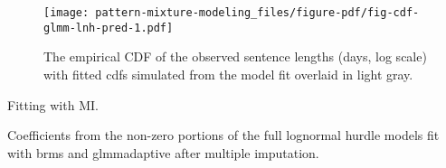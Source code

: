 \documentclass[
  letterpaper,
  DIV=11,
  numbers=noendperiod]{scrartcl}
\begin{document}
\begin{figure}

{\centering \texttt{[image: pattern-mixture-modeling\_files/figure-pdf/fig-cdf-glmm-lnh-pred-1.pdf]}

}

\caption{\label{fig-cdf-glmm-lnh-pred}The empirical CDF of the observed
sentence lengths (days, log scale) with fitted cdfs simulated from the
model fit overlaid in light gray.}

\end{figure}

Fitting with MI.

\hypertarget{tbl-coef-comp}{}
\begin{table}
\caption{\label{tbl-coef-comp}Coefficients from the non-zero portions of the full lognormal hurdle
models fit with brms and glmmadaptive after multiple imputation. }\tabularnewline


\end{table}
\end{document}
